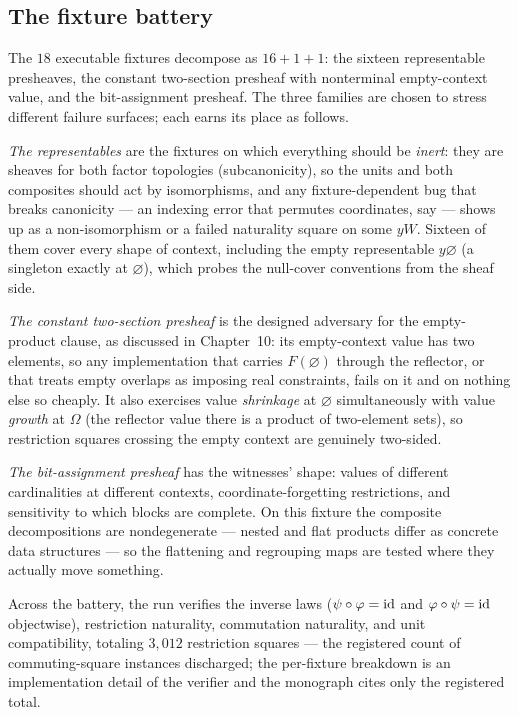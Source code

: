 \subsection{The fixture battery}
\label{ch11:sec:fixtures}

The $18$ executable fixtures decompose as $16 + 1 + 1$: the sixteen
representable presheaves, the constant two-section presheaf with
nonterminal empty-context value, and the bit-assignment presheaf. The
three families are chosen to stress different failure surfaces; each earns
its place as follows.

\emph{The representables} are the fixtures on which everything should be
\emph{inert}: they are sheaves for both factor topologies
(subcanonicity), so the units and both composites should act by
isomorphisms, and any fixture-dependent bug that breaks canonicity ---
an indexing error that permutes coordinates, say --- shows up as a
non-isomorphism or a failed naturality square on some $yW$. Sixteen of
them cover every shape of context, including the empty representable
$y\varnothing$ (a singleton exactly at $\varnothing$), which probes the
null-cover conventions from the sheaf side.

\emph{The constant two-section presheaf} is the designed adversary for
the empty-product clause, as discussed in Chapter~10: its empty-context
value has two elements, so any implementation that carries
$F(\varnothing)$ through the reflector, or that treats empty overlaps as
imposing real constraints, fails on it and on nothing else so cheaply.
It also exercises value \emph{shrinkage} at $\varnothing$ simultaneously
with value \emph{growth} at $\Omega$ (the reflector value there is a
product of two-element sets), so restriction squares crossing the empty
context are genuinely two-sided.

\emph{The bit-assignment presheaf} has the witnesses' shape: values of
different cardinalities at different contexts, coordinate-forgetting
restrictions, and sensitivity to which blocks are complete. On this
fixture the composite decompositions are nondegenerate --- nested and
flat products differ as concrete data structures --- so the flattening
and regrouping maps are tested where they actually move something.

Across the battery, the run verifies the inverse laws
($\psi \circ \varphi = \mathrm{id}$ and $\varphi \circ \psi = \mathrm{id}$ objectwise),
restriction naturality, commutation naturality, and unit compatibility,
totaling $3{,}012$ restriction squares --- the registered count of
commuting-square instances discharged; the per-fixture breakdown is an
implementation detail of the verifier and the monograph cites only the
registered total.

